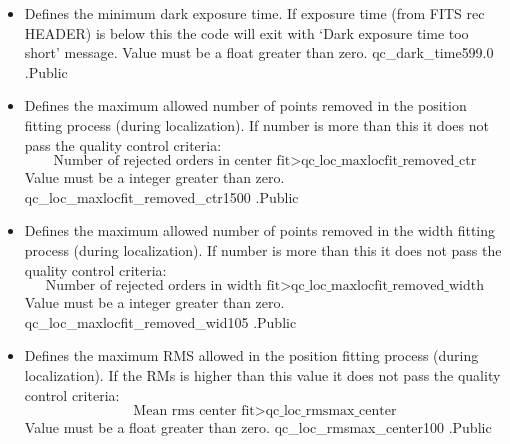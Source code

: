 \begin{itemize}
\item {}
{Defines the minimum dark exposure time. If exposure time (from FITS rec HEADER) is below this the code will exit with `Dark exposure time too short' message. Value must be a float greater than zero.}
{qc\_dark\_time}{599.0}
{\calDARK}{\constantsfile}{\calDARK.\progMAIN}{Public}


\item {} 
{Defines the maximum allowed number of points removed in the position fitting process (during localization). If number is more than this it does not pass the quality control criteria: 
\begin{equation}
\text{Number of rejected orders in center fit} >\text{qc\_loc\_maxlocfit\_removed\_ctr}
\end{equation}
Value must be a integer greater than zero.
}
{qc\_loc\_maxlocfit\_removed\_ctr}{1500}
{\callocRAW}{\constantsfile}{\callocRAW.\progMAIN}{Public}


\item {} 
{Defines the maximum allowed number of points removed in the width fitting process (during localization). If number is more than this it does not pass the quality control criteria: 
\begin{equation}
\text{Number of rejected orders in width fit} >\text{qc\_loc\_maxlocfit\_removed\_width}
\end{equation}
Value must be a integer greater than zero.
}
{qc\_loc\_maxlocfit\_removed\_wid}{105}
{\callocRAW}{\constantsfile}{\callocRAW.\progMAIN}{Public}


\item {} 
{Defines the maximum RMS allowed in the position fitting process (during localization). If the RMs is higher than this value it does not pass the quality control criteria: 
\begin{equation}
\text{Mean rms center fit} > \text{qc\_loc\_rmsmax\_center}
\end{equation}
Value must be a float greater than zero.
}
{qc\_loc\_rmsmax\_center}{100}
{\callocRAW}{\constantsfile}{\callocRAW.\progMAIN}{Public}



\end{itemize}
